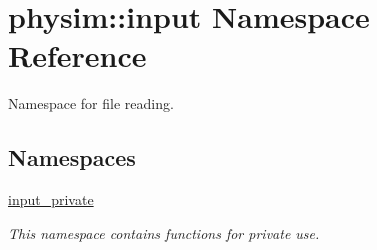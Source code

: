 \hypertarget{namespacephysim_1_1input}{}\section{physim\+:\+:input Namespace Reference}
\label{namespacephysim_1_1input}


Namespace for file reading.  


\subsection*{Namespaces}
\begin{DoxyCompactItemize}
\item 
 \hyperlink{namespacephysim_1_1input_1_1input__private}{input\+\_\+private}
\begin{DoxyCompactList}\small\item\em This namespace contains functions for private use. \end{DoxyCompactList}\end{DoxyCompactItemize}
